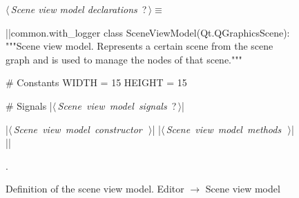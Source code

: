 \documentclass[%
    a4paper,    %
    justified,  %
    nobib,      %
    openany     %
]{tufte-book}
\begin{document}
\begin{figure}
\begin{flushleft} \small
\begin{minipage}{\linewidth}\label{scrap89}\raggedright\small
{} $\langle\,${\itshape Scene view model declarations}\nobreak\ {\footnotesize {?}}$\,\rangle\equiv$
\vspace{-1ex}
\begin{pythoncode}
|\normalfont{}\fontfamily{}|common.with_logger
class SceneViewModel(Qt.QGraphicsScene):
    """Scene view model.
    Represents a certain scene from the scene graph and is used to manage the
    nodes of that scene."""

    # Constants
    WIDTH = 15
    HEIGHT = 15

    # Signals
    |\hbox{$\langle\,${\itshape Scene view model signals}\nobreak\ {\footnotesize ?}$\,\rangle$}|

    |\hbox{$\langle\,${\itshape Scene view model constructor}\nobreak\ {\footnotesize {}}$\,\rangle$}|
    |\hbox{$\langle\,${\itshape Scene view model methods}\nobreak\ {\footnotesize {}}$\,\rangle$}|
|\NWsep|
\end{pythoncode}
\vspace{1.5ex}
\footnotesize
\begin{list}{}{\setlength{\itemsep}{-\parsep}\setlength{\itemindent}{-\leftmargin}}
\item {\NWtxtMacroNoRef}.

\item{}
\end{list}
\end{minipage}\vspace{4ex}
\end{flushleft}
\caption{Definition of the scene view model.
  \newline{}\newline{}Editor $\rightarrow$ Scene view model}
\label{editor:lst:scene-view-model}
\end{figure}
\end{document}
